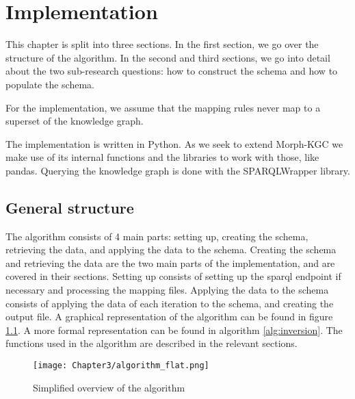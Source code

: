 \chapter{Implementation}
\label{chapter:implementation}
This chapter is split into three sections. In the first section, we go over the structure of the algorithm. In the second and third sections, we go into detail about the two sub-research questions: how to construct the schema and how to populate the schema. 



For the implementation, we assume that the mapping rules never map to a superset of the knowledge graph. 

The implementation is written in Python. As we seek to extend Morph-KGC we make use of its internal functions and the libraries to work with those, like pandas. Querying the knowledge graph is done with the SPARQLWrapper library.

\section{General structure}
The algorithm consists of 4 main parts: setting up, creating the schema, retrieving the data, and applying the data to the schema. Creating the schema and retrieving the data are the two main parts of the implementation, and are covered in their sections. Setting up consists of setting up the \acrshort{sparql} endpoint if necessary and processing the mapping files. Applying the data to the schema consists of applying the data of each iteration to the schema, and creating the output file. A graphical representation of the algorithm can be found in figure \ref{fig:algorithm}. A more formal representation can be found in algorithm \ref{alg:inversion}. The functions used in the algorithm are described in the relevant sections.

\begin{figure}[h]
    \centering
    \texttt{[image: Chapter3/algorithm\_flat.png]}
    \caption{Simplified overview of the algorithm}
    \label{fig:algorithm}
\end{figure}

